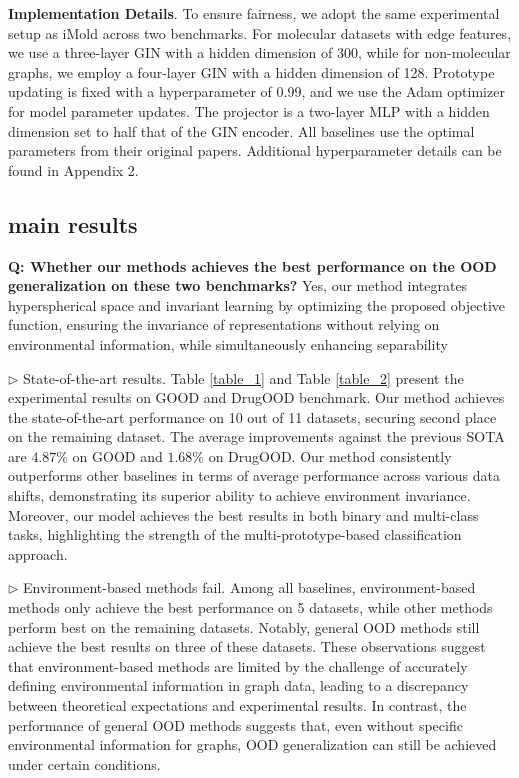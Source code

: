 \textbf{Implementation Details}. To ensure fairness, we adopt the same experimental setup as iMold across two benchmarks. For molecular datasets with edge features, we use a three-layer GIN with a hidden dimension of 300, while for non-molecular graphs, we employ a four-layer GIN with a hidden dimension of 128. Prototype updating is fixed with a hyperparameter of 0.99, and we use the Adam optimizer for model parameter updates. The projector is a two-layer MLP with a hidden dimension set to half that of the GIN encoder. All baselines use the optimal parameters from their original papers. Additional hyperparameter details can be found in Appendix 2.

\subsection{main results}

\textbf{Q: Whether our methods achieves the best performance on the OOD generalization on these two benchmarks?} 
Yes, our method integrates hyperspherical space and invariant learning by optimizing the proposed objective function, ensuring the invariance of representations without relying on environmental information, while simultaneously enhancing separability

 \noindent$\rhd$ \textsf{State-of-the-art results.}
Table \ref{table_1} and Table \ref{table_2} present the experimental results on GOOD and DrugOOD benchmark. Our method achieves the state-of-the-art performance on 10 out of 11 datasets, securing second place on the remaining dataset. The average improvements against the previous SOTA are $4.87\%$ on GOOD and $1.68\%$ on DrugOOD. Our method consistently outperforms other baselines in terms of average performance across various data shifts, demonstrating its superior ability to achieve environment invariance. Moreover, our model achieves the best results in both binary and multi-class tasks, highlighting the strength of the multi-prototype-based classification approach.

 \noindent$\rhd$ \textsf{Environment-based methods fail.}
Among all baselines, environment-based methods only achieve the best performance on 5 datasets, while other methods perform best on the remaining datasets. Notably, general OOD methods still achieve the best results on three of these datasets. These observations suggest that environment-based methods are limited by the challenge of accurately defining environmental information in graph data, leading to a discrepancy between theoretical expectations and experimental results. In contrast, the performance of general OOD methods suggests that, even without specific environmental information for graphs, OOD generalization can still be achieved under certain conditions. 
